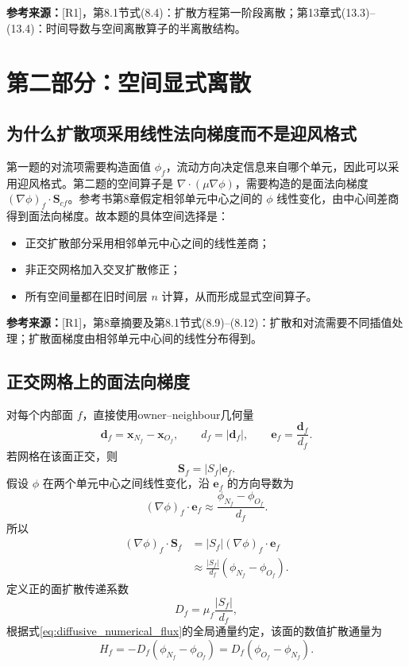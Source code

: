 \documentclass[UTF8,12pt,a4paper]{ctexart}
\numberwithin{equation}{section}
\newcommand{\Rone}{\textnormal{[R1]}}
\newcommand{\source}[1]{%
  \par\smallskip
  \noindent\colorbox{sourcebg}{%
    \parbox{0.955\linewidth}{\raggedright\footnotesize\color{sourcegray}\textbf{参考来源：}#1}%
  }
  \par\smallskip
}
\newcommand{\Sf}{\bm S}
\newcommand{\xf}{\bm x}
\newcommand{\ef}{\bm e}
\begin{document}
\source{\Rone，第8.1节式(8.4)：扩散方程第一阶段离散；第13章式(13.3)--(13.4)：时间导数与空间离散算子的半离散结构。}

\newpage
\section{第二部分：空间显式离散}

\subsection{为什么扩散项采用线性法向梯度而不是迎风格式}

第一题的对流项需要构造面值 $\phi_f$，流动方向决定信息来自哪个单元，因此可以采用迎风格式。第二题的空间算子是 $\nabla\cdot(\mu\nabla\phi)$，需要构造的是面法向梯度 $(\nabla\phi)_f\cdot\Sf_{cf}$。参考书第8章假定相邻单元中心之间的 $\phi$ 线性变化，由中心间差商得到面法向梯度。故本题的具体空间选择是：
\begin{itemize}
  \item 正交扩散部分采用相邻单元中心之间的线性差商；
  \item 非正交网格加入交叉扩散修正；
  \item 所有空间量都在旧时间层 $n$ 计算，从而形成显式空间算子。
\end{itemize}

\source{\Rone，第8章摘要及第8.1节式(8.9)--(8.12)：扩散和对流需要不同插值处理；扩散面梯度由相邻单元中心间的线性分布得到。}

\subsection{正交网格上的面法向梯度}

对每个内部面 $f$，直接使用owner--neighbour几何量
\begin{equation}
  \bm d_f=\xf_{N_f}-\xf_{O_f},
  \qquad
  d_f=|\bm d_f|,
  \qquad
  \ef_f=\frac{\bm d_f}{d_f}.
  \label{eq:center_vector}
\end{equation}
若网格在该面正交，则
\begin{equation}
  \Sf_f=|S_f|\ef_f.
  \label{eq:orthogonal_area_vector}
\end{equation}
假设 $\phi$ 在两个单元中心之间线性变化，沿 $\ef_f$ 的方向导数为
\begin{equation}
  (\nabla\phi)_f\cdot\ef_f
  \approx\frac{\phi_{N_f}-\phi_{O_f}}{d_f}.
  \label{eq:normal_difference}
\end{equation}
所以
\begin{align}
  (\nabla\phi)_f\cdot\Sf_f
  &=|S_f|(\nabla\phi)_f\cdot\ef_f
    \label{eq:orth_grad_1}\\
  &\approx\frac{|S_f|}{d_f}(\phi_{N_f}-\phi_{O_f}).
    \label{eq:orth_grad_2}
\end{align}
定义正的面扩散传递系数
\begin{equation}
  \boxed{D_f=\mu_f\frac{|S_f|}{d_f}},
  \label{eq:D_orth}
\end{equation}
根据式\eqref{eq:diffusive_numerical_flux}的全局通量约定，该面的数值扩散通量为
\begin{equation}
  \boxed{
  H_f=-D_f(\phi_{N_f}-\phi_{O_f})
  =D_f(\phi_{O_f}-\phi_{N_f})}.
  \label{eq:orth_face_contribution}
\end{equation}
\end{document}
